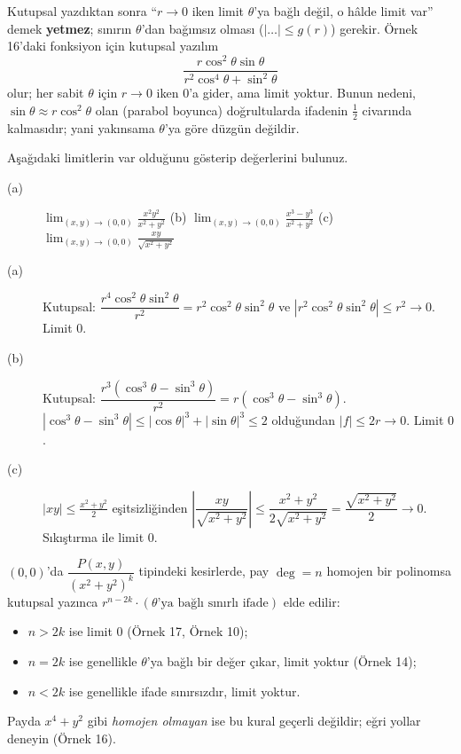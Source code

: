 \begin{dikkat}
Kutupsal yazdıktan sonra ``$r\to0$ iken limit $\theta$'ya bağlı değil, o hâlde limit var'' demek \textbf{yetmez}; sınırın
$\theta$'dan bağımsız olması ($|\dots|\le g(r)$) gerekir. Örnek 16'daki fonksiyon için kutupsal yazılım
\[
\frac{r\cos^2\theta\sin\theta}{r^2\cos^4\theta+\sin^2\theta}
\]
olur; her sabit $\theta$ için $r\to0$ iken $0$'a gider, ama limit yoktur. Bunun nedeni, $\sin\theta\approx r\cos^2\theta$
olan (parabol boyunca) doğrultularda ifadenin $\frac12$ civarında kalmasıdır; yani yakınsama $\theta$'ya göre
düzgün değildir.
\end{dikkat}

\begin{soru}
Aşağıdaki limitlerin var olduğunu gösterip değerlerini bulunuz.
\begin{description}
  \item[(a)] $\displaystyle\lim_{(x,y)\to(0,0)}\frac{x^2y^2}{x^2+y^2}$ \qquad
  (b) $\displaystyle\lim_{(x,y)\to(0,0)}\frac{x^3-y^3}{x^2+y^2}$ \qquad
  (c) $\displaystyle\lim_{(x,y)\to(0,0)}\frac{xy}{\sqrt{x^2+y^2}}$
\end{description}
\end{soru}
\begin{cevap}
\begin{description}
  \item[(a)] Kutupsal: $\dfrac{r^4\cos^2\theta\sin^2\theta}{r^2}=r^2\cos^2\theta\sin^2\theta$ ve
  $|r^2\cos^2\theta\sin^2\theta|\le r^2\to0$. Limit $0$.
  \item[(b)] Kutupsal: $\dfrac{r^3(\cos^3\theta-\sin^3\theta)}{r^2}=r(\cos^3\theta-\sin^3\theta)$.
  $|\cos^3\theta-\sin^3\theta|\le|\cos\theta|^3+|\sin\theta|^3\le2$ olduğundan $|f|\le2r\to0$. Limit $0$.
  \item[(c)] $|xy|\le\frac{x^2+y^2}{2}$ eşitsizliğinden
  $\left|\dfrac{xy}{\sqrt{x^2+y^2}}\right|\le\dfrac{x^2+y^2}{2\sqrt{x^2+y^2}}=\dfrac{\sqrt{x^2+y^2}}{2}\to0$.
  Sıkıştırma ile limit $0$.
\end{description}
\end{cevap}

\begin{bilgi}
$(0,0)$'da $\dfrac{P(x,y)}{(x^2+y^2)^k}$ tipindeki kesirlerde, pay $\deg=n$ homojen bir polinomsa kutupsal yazınca
$r^{n-2k}\cdot(\theta\text{'ya bağlı sınırlı ifade})$ elde edilir:
\begin{itemize}
  \item $n>2k$ ise limit $0$ (Örnek 17, Örnek 10);
  \item $n=2k$ ise genellikle $\theta$'ya bağlı bir değer çıkar, limit yoktur (Örnek 14);
  \item $n<2k$ ise genellikle ifade sınırsızdır, limit yoktur.
\end{itemize}
Payda $x^4+y^2$ gibi \emph{homojen olmayan} ise bu kural geçerli değildir; eğri yollar deneyin (Örnek 16).
\end{bilgi}

